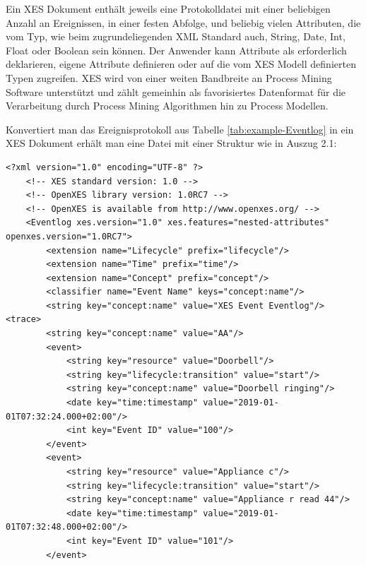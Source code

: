 Ein XES Dokument enthält jeweils eine Protokolldatei mit einer beliebigen Anzahl an Ereignissen, in einer festen Abfolge, und beliebig vielen Attributen, die vom Typ, wie beim zugrundeliegenden XML Standard auch, String, Date, Int, Float oder Boolean sein können. 
Der Anwender kann Attribute als erforderlich deklarieren, eigene Attribute definieren oder auf die vom XES Modell definierten Typen zugreifen. XES  wird von einer weiten Bandbreite an Process Mining Software unterstützt und zählt gemeinhin als favorisiertes Datenformat für die Verarbeitung durch Process Mining Algorithmen hin zu Process Modellen.

Konvertiert man das Ereignisprotokoll aus Tabelle \ref{tab:example-Eventlog} in ein XES Dokument erhält man eine Datei mit einer Struktur wie in Auszug 2.1:

\lstset{language=XML}
\begin{lstlisting}[label=lst:xes,caption=Auszug aus XES Datei zu Eventlog in Tabelle 2,captionpos=b]
<?xml version="1.0" encoding="UTF-8" ?>
    <!-- XES standard version: 1.0 -->
    <!-- OpenXES library version: 1.0RC7 -->
    <!-- OpenXES is available from http://www.openxes.org/ -->
    <Eventlog xes.version="1.0" xes.features="nested-attributes" openxes.version="1.0RC7">
    	<extension name="Lifecycle" prefix="lifecycle"/>
    	<extension name="Time" prefix="time"/>
    	<extension name="Concept" prefix="concept"/>
    	<classifier name="Event Name" keys="concept:name"/>
    	<string key="concept:name" value="XES Event Eventlog"/>	<trace>
		<string key="concept:name" value="AA"/>
		<event>
			<string key="resource" value="Doorbell"/>
			<string key="lifecycle:transition" value="start"/>
			<string key="concept:name" value="Doorbell ringing"/>
			<date key="time:timestamp" value="2019-01-01T07:32:24.000+02:00"/>
			<int key="Event ID" value="100"/>
		</event>
		<event>
			<string key="resource" value="Appliance c"/>
			<string key="lifecycle:transition" value="start"/>
			<string key="concept:name" value="Appliance r read 44"/>
			<date key="time:timestamp" value="2019-01-01T07:32:48.000+02:00"/>
			<int key="Event ID" value="101"/>
		</event>
\end{lstlisting}